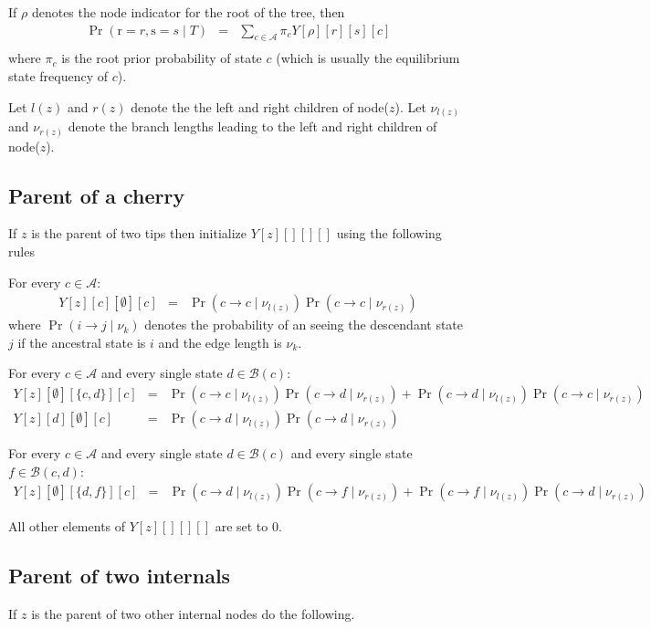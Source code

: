 \documentclass[11pt]{article}
\begin{document}
If $\rho$ denotes the node indicator for the root of the tree, then
\begin{eqnarray*}
\Pr(\mbox{r}=r, \mbox{s}=s\mid T) & = & \sum_{c\in\mathcal{A}} \pi_c Y[\rho][r][s][c]\\
\end{eqnarray*}
where $\pi_c$ is the root prior probability of state $c$ (which is
usually the equilibrium state frequency of $c$).


Let $l(z)$ and $r(z)$ denote the the left and right children of node($z$).
Let $\nu_{l(z)}$ and $\nu_{r(z)}$ denote the  branch lengths leading to the left and right children of node($z$).

\subsection{Parent of a cherry}
If $z$ is the parent of two tips then initialize $Y[z][][][]$ using the following rules

For every $c\in \mathcal{A}$:
\begin{eqnarray*}
Y[z][c][\emptyset][c] & = & \Pr(c\rightarrow c\mid \nu_{l(z)})\Pr(c\rightarrow c\mid \nu_{r(z)})
\end{eqnarray*}
where  $\Pr(i\rightarrow j\mid \nu_{k})$ denotes the probability of an 
	seeing the descendant state $j$ if the ancestral state is $i$ and 
	the edge length is $\nu_{k}$.


For every $c\in \mathcal{A}$ and every single state $d \in \mathcal{B}(c)$:
\begin{eqnarray*}
Y[z][\emptyset][\{c,d\}][c] & = & \Pr(c\rightarrow c\mid \nu_{l(z)})\Pr(c\rightarrow d\mid \nu_{r(z)}) + \Pr(c\rightarrow d\mid \nu_{l(z)})\Pr(c\rightarrow c\mid \nu_{r(z)}) \\
Y[z][d][\emptyset][c] & = & \Pr(c\rightarrow d\mid \nu_{l(z)})\Pr(c\rightarrow d\mid \nu_{r(z)})
\end{eqnarray*}

For every $c\in \mathcal{A}$ and every single state $d \in \mathcal{B}(c)$ and every single state $f\in\mathcal{B}(c,d)$:
\begin{eqnarray*}
Y[z][\emptyset][\{d,f\}][c] & = & \Pr(c\rightarrow d\mid \nu_{l(z)})\Pr(c\rightarrow f\mid \nu_{r(z)}) + \Pr(c\rightarrow f\mid \nu_{l(z)})\Pr(c\rightarrow d\mid \nu_{r(z)})
\end{eqnarray*}

All other elements of $Y[z][][][]$ are set to 0.

\subsection{Parent of two internals}
If $z$ is the parent of two other internal nodes do the following.
\end{document}
